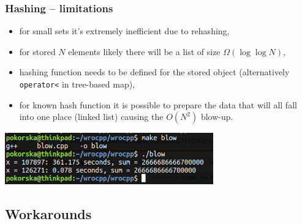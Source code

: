\documentclass{beamer}
\begin{document}
\begin{frame}
    \frametitle{Hashing -- limitations}
    \pause
    \begin{itemize}
        \item for small sets it's extremely inefficient due to rehashing, \pause
        \item for stored $N$ elements likely there will be a list
            of size $\Omega(\log \log N)$, \pause
        \item hashing function needs to be defined for the stored object
            (alternatively \texttt{operator<} in tree-based map), \pause
        \item for known hash function it is possible to prepare the data
            that will all fall into one place (linked list) causing
            the $O(N^2)$ blow-up. \pause
    \end{itemize}

    \begin{center}
    \includegraphics[width=9cm]{blow.png}
    \end{center}
\end{frame}

\subsection{Workarounds}
\end{document}
